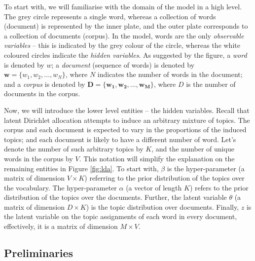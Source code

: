 \documentclass{mprop}
\begin{document}
\par To start with, we will familiarise with the domain of the model in a high level. The grey circle represents a single word, whereas a collection of words (document) is represented by the inner plate, and the outer plate corresponds to a collection of documents (corpus). In the model, words are the only \textit{observable variables} -- this is indicated by the grey colour of the circle, whereas the white coloured circles indicate the \textit{hidden variables}. As suggested by the figure, a \textit{word} is denoted by $w$; a \textit{document} (sequence of words) is denoted by $\mathbf{w} = \{w_1, w_2, \dots, w_N\}$, where $N$ indicates the number of words in the document; and a \textit{corpus} is denoted by $\mathcal{\mathbf{D}} = \{\mathbf{w_1}, \mathbf{w_2}, \dots, \mathbf{w_M}\}$, where $D$ is the number of documents in the corpus. 
 
\par Now, we will introduce the lower level entities -- the hidden variables. Recall that latent Dirichlet allocation attempts to induce an arbitrary mixture of topics. The corpus and each document is expected to vary in the proportions of the induced topics; and each document is likely to have a different number of word. Let's denote the number of such arbitrary topics by $K$, and the number of unique words in the corpus by $V$. This notation will simplify the explanation on the remaining entities in Figure \ref{fig:lda}. To start with, $\beta$ is the hyper-parameter (a matrix of dimension $V \times K$) referring to the prior distribution of the topics over the vocabulary. The hyper-parameter $\alpha$ (a vector of length $K$) refers to the prior distribution of the topics over the documents. Further, the latent variable $\theta$ (a matrix of dimension $D \times K$) is the topic distribution over documents. Finally, $z$ is the latent variable on the topic assignments of each word in every document, effectively, it is a matrix of dimension $M \times V$.

\subsection{Preliminaries}
\end{document}
